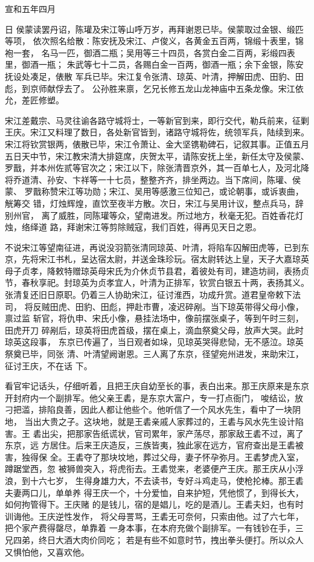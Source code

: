 宣和五年四月

日
侯蒙读罢丹诏，陈瓘及宋江等山呼万岁，再拜谢恩已毕。侯蒙取过金银、缎匹等项，
依次照名给散：陈安抚及宋江、卢俊义，各黄金五百两，锦缎十表里，锦袍一套，
名马一匹，御酒二瓶；吴用等三十四员，各赏白金二百两，彩缎四表里，御酒一瓶；
朱武等七十二员，各赐白金一百两，御酒一瓶；余下金银，陈安抚设处凑足，俵散
军兵已毕。宋江复令张清、琼英、叶清，押解田虎、田豹、田彪，到京师献俘去了。
公孙胜来禀，乞兄长修五龙山龙神庙中五条龙像。宋江依允，差匠修塑。

宋江差戴宗、马灵往谕各路守城将士，一等新官到来，即行交代，勒兵前来，征剿
王庆。宋江又料理了数日，各处新官皆到，诸路守城将佐，统领军兵，陆续到来。
宋江将钦赏银两，俵散已毕，宋江令萧让、金大坚镌勒碑石，记叙其事。正值五月
五日天中节，宋江教宋清大排筵席，庆贺太平，请陈安抚上坐，新任太守及侯蒙、
罗戬，并本州佐贰等官次之；宋江以下，除张清晋京外，其一百单七人，及河北降
将乔道清、孙安、卞祥等一十七员，整整齐齐，排坐两边。当下席间，陈瓘、侯蒙、
罗戬称赞宋江等功勋；宋江、吴用等感激三位知己，或论朝事，或诉衷曲，觥筹交
错，灯烛辉煌，直饮至夜半方散。次日，宋江与吴用计议，整点兵马，辞别州官，
离了威胜，同陈瓘等众，望南进发。所过地方，秋毫无犯。百姓香花灯烛，络绎道
路，拜谢宋江等剪除贼寇，我们百姓，得再见天日之恩。

不说宋江等望南征进，再说没羽箭张清同琼英、叶清，将陷车囚解田虎等，已到东
京，先将宋江书札，呈达宿太尉，并送金珠珍玩。宿太尉转达上皇，天子大嘉琼英
母子贞孝，降敕特赠琼英母宋氏为介休贞节县君，着彼处有司，建造坊祠，表扬贞
节，春秋享祀。封琼英为贞孝宜人，叶清为正排军，钦赏白银五十两，表扬其义。
张清复还旧日原职。仍着三人协助宋江，征讨淮西，功成升赏。道君皇帝敕下法司，
将反贼田虎、田豹、田彪，押赴市曹，凌迟碎剐。当下琼英带得父母小像，禀过监
斩官，将仇申、宋氏小像，悬挂法场中，像前摆张桌子，等到午时三刻，田虎开刀
碎剐后，琼英将田虎首级，摆在桌上，滴血祭奠父母，放声大哭。此时琼英这段事，
东京已传遍了，当日观者如垛，见琼英哭得悲恸，无不感泣。琼英祭奠已毕，同张
清、叶清望阙谢恩。三人离了东京，径望宛州进发，来助宋江，征讨王庆，不在话
下。

看官牢记话头，仔细听着，且把王庆自幼至长的事，表白出来。那王庆原来是东京
开封府内一个副排军。他父亲王砉，是东京大富户，专一打点衙门，唆结讼，放
刁把滥，排陷良善，因此人都让他些个。他听信了一个风水先生，看中了一块阴地，
当出大贵之子。这块地，就是王砉亲戚人家葬过的，王砉与风水先生设计陷害。王
砉出尖，把那家告纸谎状，官司累年，家产荡尽，那家敌王砉不过，离了东京，远
方居住。后来王庆造反，三族皆夷，独此家在远方，官府查出是王砉被害，独得保
全。王砉夺了那块坟地，葬过父母，妻子怀孕弥月。王砉梦虎入室，蹲踞堂西，忽
被狮兽突入，将虎衔去。王砉觉来，老婆便产王庆。那王庆从小浮浪，到十六七岁，
生得身雄力大，不去读书，专好斗鸡走马，使枪抡棒。那王砉夫妻两口儿，单单养
得王庆一个，十分爱恤，自来护短，凭他惯了，到得长大，如何拘管得下。王庆赌
的是钱儿，宿的是娼儿，吃的是酒儿。王砉夫妇，也有时训诲他。王庆逆性发作，
将父母詈骂，王砉无可奈何，只索由他。过了六七年，把个家产费得罄尽，单靠着
一身本事，在本府充做个副排军。一有钱钞在手，三兄四弟，终日大酒大肉价同吃；
若是有些不如意时节，拽出拳头便打。所以众人又惧怕他，又喜欢他。

